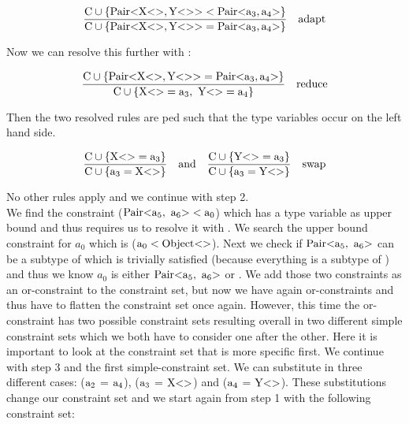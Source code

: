 \begin{align*}
    \frac{\text{C} \cup \{ \text{Pair} \text{<} \text{X} \text{<}  \text{>}, \text{Y} \text{<}  \text{>} \text{>} < \text{Pair} \text{<} \text{a}_{3}, \text{a}_{4} \text{>} \} }{\text{C} \cup \{ \text{Pair} \text{<} \text{X} \text{<}  \text{>}, \text{Y} \text{<}  \text{>} \text{>} = \text{Pair} \text{<} \text{a}_{3}, \text{a}_{4} \text{>} \} } \quad \text{adapt}
\end{align*}

Now we can resolve this further with :

\begin{align*}
    \frac{\cand \{ \nvtt{Pair}{\nvtt{X}{}, \nvtt{Y}{}} = \nvtt{Pair}{\fa{3}, \fa{4}} \} }{\cand \{ \nvtt{X}{} = \fa{3}, \ \nvtt{Y}{} = \fa{4} \} } \quad \text{reduce}
\end{align*}

Then the two resolved rules are ped such that the type variables  occur on the left hand side.

\begin{align*}
    \frac{\text{C} \cup \{ \text{X} \text{<}  \text{>} = \text{a}_{3} \} }{\text{C} \cup \{ \text{a}_{3} = \text{X} \text{<}  \text{>} \} } \quad \text{and} \quad \frac{\text{C} \cup \{ \text{Y} \text{<}  \text{>} = \text{a}_{3} \} }{\text{C} \cup \{ \text{a}_{3} = \text{Y} \text{<}  \text{>} \} } \quad \text{swap}
\end{align*}

No other rules apply and we continue with step 2.\\

We find the constraint ($\nvtt{Pair}{\fa{5}, \ \fa{6}} < \fa{0}$) which has a type variable as upper bound and thus requires us to resolve it with . We search the upper bound constraint for $a_0$ which is ($\text{a}_{0} < \text{Object} \text{<}  \text{>}$).
Next we check if $\nvtt{Pair}{\fa{5}, \ \fa{6}}$ can be a subtype of  which is trivially satisfied (because everything is a subtype of ) and thus we know $a_0$ is either $\nvtt{Pair}{\fa{5}, \ \fa{6}}$ or . We add those two constraints as an or-constraint
to the constraint set, but now we have again or-constraints and thus have to flatten the constraint set once again. However, this time the or-constraint has two possible constraint sets resulting overall in two different simple constraint sets which we both have to consider one after the other.
Here it is important to look at the constraint set that is more specific first. We continue with step 3 and the first simple-constraint set. We can substitute in three different cases: ($\text{a}_{2}$ = $\text{a}_{4}$), ($\text{a}_{3}$ = $\text{X} \text{<}  \text{>}$) and ($\text{a}_{4}$ = $\text{Y} \text{<}  \text{>}$).
These substitutions change our constraint set and we start again from step 1 with the following constraint set:

